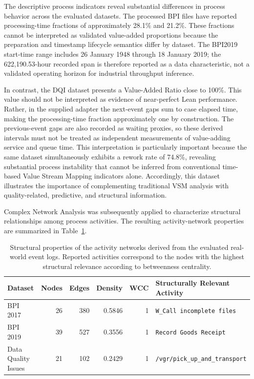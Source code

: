 The descriptive process indicators reveal substantial differences in process
behavior across the evaluated datasets. The processed BPI files have reported processing-time fractions of approximately 28.1\% and 21.2\%. These fractions cannot be interpreted as validated value-added proportions because the preparation and timestamp lifecycle semantics differ by dataset. The BPI2019 start-time range includes 26 January 1948 through 18 January 2019; the 622,190.53-hour recorded span is therefore reported as a data characteristic, not a validated operating horizon for industrial throughput inference.

In contrast, the DQI dataset presents a Value-Added Ratio close to
100\%. This value should not be interpreted as evidence of near-perfect Lean
performance. Rather, in the supplied adapter the next-event gaps sum to case elapsed time, making the processing-time fraction approximately one by construction. The previous-event gaps are also recorded as waiting proxies, so these derived intervals must not be treated as independent measurements of value-adding service and queue time. This interpretation is particularly important
because the same dataset simultaneously exhibits a rework rate of
74.8\%, revealing substantial process instability that cannot be inferred
from conventional time-based Value Stream Mapping indicators alone.
Accordingly, this dataset illustrates the importance of complementing
traditional VSM analysis with quality-related, predictive, and structural
information.

Complex Network Analysis was subsequently applied to characterize structural
relationships among process activities. The resulting activity-network
properties are summarized in
Table~\ref{tab:network_metrics}.

\begin{table}[t]
\caption{
Structural properties of the activity networks derived from the evaluated
real-world event logs. Reported activities correspond to the nodes with the
highest structural relevance according to betweenness centrality.
}
\label{tab:network_metrics}
\centering
\small
\begin{tabularx}{\textwidth}{lrrrrX}
\toprule
\textbf{Dataset} &
\textbf{Nodes} &
\textbf{Edges} &
\textbf{Density} &
\textbf{WCC} &
\textbf{Structurally Relevant Activity} \\
\midrule

BPI 2017 & 26 & 380 & 0.5846 & 1 & \texttt{W\_Call incomplete files} \\
BPI 2019 & 39 & 527 & 0.3556 & 1 & \texttt{Record Goods Receipt} \\
Data Quality Issues & 21 & 102 & 0.2429 & 1 & \texttt{/vgr/pick\_up\_and\_transport} \\
\bottomrule
\end{tabularx}
\end{table}

